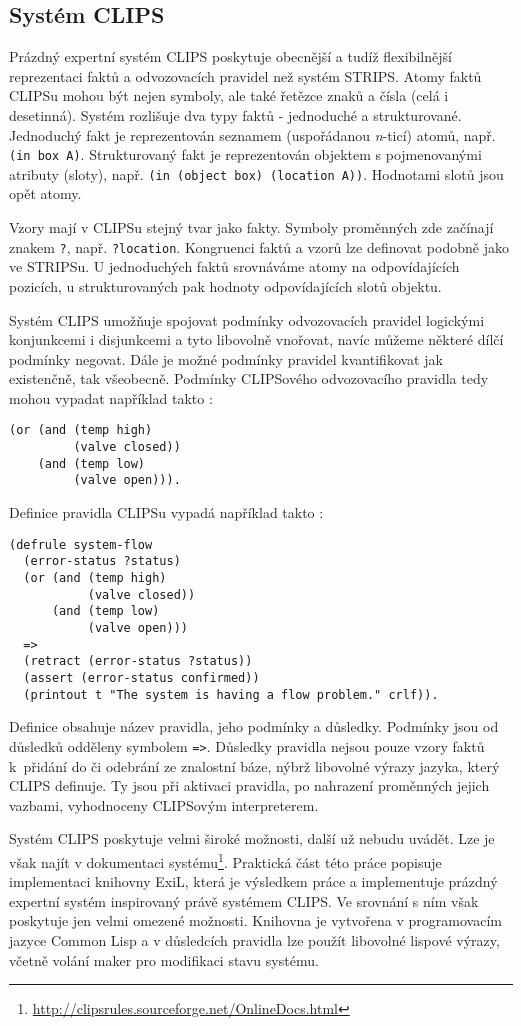 \subsection{Systém CLIPS}

Prázdný expertní systém CLIPS poskytuje obecnější a tudíž flexibilnější
reprezentaci faktů a odvozovacích pravidel než systém STRIPS. Atomy faktů CLIPSu
mohou být nejen symboly, ale také řetězce znaků a čísla (celá i desetinná).
Systém rozlišuje dva typy faktů - jednoduché a strukturované. Jednoduchý fakt je
reprezentován seznamem (uspořádanou \emph{n}-ticí) atomů, např.
\verb|(in box A)|. Strukturovaný fakt je reprezentován objektem s pojmenovanými
atributy (sloty), např. \verb|(in (object box) (location A))|. Hodnotami slotů jsou
opět atomy.

Vzory mají v CLIPSu stejný tvar jako fakty. Symboly proměnných zde začínají
znakem \verb|?|, např. \verb|?location|. Kongruenci faktů a vzorů lze definovat
podobně jako ve STRIPSu. U jednoduchých faktů srovnáváme atomy na odpovídajících
pozicích, u strukturovaných pak hodnoty odpovídajících slotů objektu.

Systém CLIPS umožňuje spojovat podmínky odvozovacích pravidel logickými
konjunkcemi i disjunkcemi a tyto libovolně vnořovat, navíc můžeme některé dílčí
podmínky negovat. Dále je možné podmínky pravidel kvantifikovat jak existenčně,
tak všeobecně. Podmínky CLIPSového odvozovacího pravidla tedy mohou vypadat
například takto \cite{clips}:
\begin{verbatim}
(or (and (temp high)
         (valve closed))
    (and (temp low)
         (valve open))).
\end{verbatim}

Definice pravidla CLIPSu vypadá například takto \cite{clips}:
\begin{verbatim}
(defrule system-flow
  (error-status ?status)
  (or (and (temp high)
           (valve closed))
      (and (temp low)
           (valve open)))
  =>
  (retract (error-status ?status))
  (assert (error-status confirmed))
  (printout t "The system is having a flow problem." crlf)).
\end{verbatim}
Definice obsahuje název pravidla, jeho podmínky a důsledky. Podmínky jsou od
důsledků odděleny symbolem \verb|=>|. Důsledky pravidla nejsou pouze vzory faktů
k~přidání do či odebrání ze znalostní báze, nýbrž libovolné výrazy jazyka, který
CLIPS definuje. Ty jsou při aktivaci pravidla, po nahrazení proměnných jejich
vazbami, vyhodnoceny CLIPSovým interpreterem.

Systém CLIPS poskytuje velmi široké možnosti, další už nebudu uvádět. Lze je
však najít v dokumentaci
systému\footnote{\url{http://clipsrules.sourceforge.net/OnlineDocs.html}}.
Praktická část této práce popisuje implementaci knihovny ExiL, která je
výsledkem práce a implementuje prázdný expertní systém inspirovaný právě
systémem CLIPS.  Ve srovnání s ním však poskytuje jen velmi omezené možnosti.
Knihovna je vytvořena v programovacím jazyce Common Lisp a v důsledcích pravidla
lze použít libovolné lispové výrazy, včetně volání maker pro modifikaci stavu
systému.
